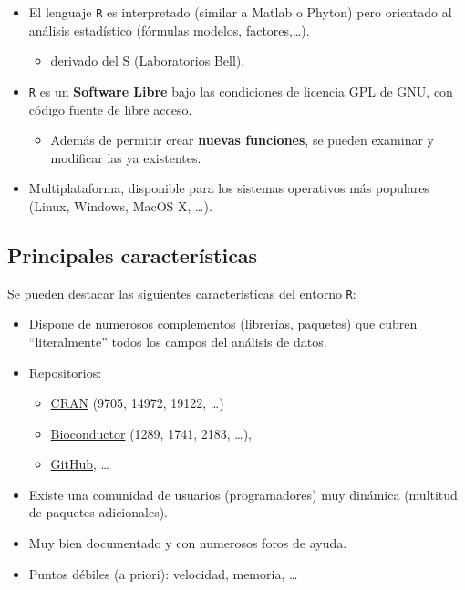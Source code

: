 \documentclass[
]{book}
\providecommand{\tightlist}{%
  \setlength{\itemsep}{0pt}\setlength{\parskip}{0pt}}
\theoremstyle{break}
\theoremstyle{nonumberplain}
\begin{document}
\begin{itemize}
\item
  El lenguaje \texttt{R} es interpretado (similar a Matlab o Phyton) pero orientado al
  análisis estadístico (fórmulas modelos, factores,\ldots).

  \begin{itemize}
  \tightlist
  \item
    derivado del S (Laboratorios Bell).
  \end{itemize}
\item
  \texttt{R} es un \textbf{Software Libre} bajo las condiciones de licencia GPL de
  GNU, con código fuente de libre acceso.

  \begin{itemize}
  \tightlist
  \item
    Además de permitir crear \textbf{nuevas funciones},
    se pueden examinar y modificar las ya existentes.
  \end{itemize}
\item
  Multiplataforma,
  disponible para los sistemas operativos más populares (Linux, Windows, MacOS X, \ldots).
\end{itemize}

\hypertarget{principales-caracteruxedsticas}{%
\subsection{Principales características}\label{principales-caracteruxedsticas}}

Se pueden destacar las siguientes características del entorno \texttt{R}:

\begin{itemize}
\item
  Dispone de numerosos complementos (librerías, paquetes) que cubren ``literalmente'' todos los campos del análisis de datos.
\item
  Repositorios:

  \begin{itemize}
  \item
    \href{https://cran.r-project.org}{CRAN} (9705, 14972, 19122, \ldots)
  \item
    \href{https://www.bioconductor.org}{Bioconductor} (1289, 1741, 2183, \ldots),
  \item
    \href{https://github.com/trending/r?since=monthly}{GitHub}, \ldots{}
  \end{itemize}
\item
  Existe una comunidad de usuarios (programadores) muy dinámica
  (multitud de paquetes adicionales).
\item
  Muy bien documentado y con numerosos foros de ayuda.
\item
  Puntos débiles (a priori): velocidad, memoria, \ldots{}
\end{itemize}
\end{document}

